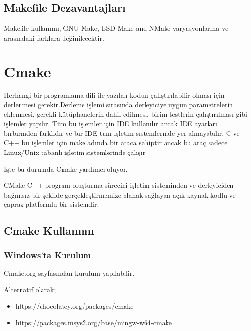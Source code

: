 \documentclass[
]{book}
\providecommand{\tightlist}{%
  \setlength{\itemsep}{0pt}\setlength{\parskip}{0pt}}
\begin{document}
\hypertarget{makefile-dezavantajlarux131}{%
\section{Makefile Dezavantajları}\label{makefile-dezavantajlarux131}}

Makefile kullanımı, GNU Make, BSD Make and NMake varyasyonlarına ve arasındaki farklara değinilecektir.

\hypertarget{cmake}{%
\chapter{Cmake}\label{cmake}}

Herhangi bir programlama dili ile yazılan kodun çalıştırılabilir olması için derlenmesi gerekir.Derleme işlemi sırasında derleyiciye uygun parametrelerin eklenmesi, gerekli kütüphanelerin dahil edilmesi, birim testlerin çalıştırılması gibi işlemler yapılır. Tüm bu işlemler için IDE kullanılır ancak IDE ayarları birbirinden farklıdır ve bir IDE tüm işletim sistemlerinde yer almayabilir.
C ve C++ bu işlemler için make adında bir araca sahiptir ancak bu araç sadece Linux/Unix tabanlı işletim sistemlerinde çalışır.

İşte bu durumda Cmake yardımcı oluyor.

CMake C++ program oluşturma sürecini işletim sisteminden ve derleyiciden bağımsız bir şekilde gerçekleştirmemize olanak sağlayan açık kaynak kodlu ve çapraz platformlu bir sistemdir.

\hypertarget{cmake-kullanux131mux131}{%
\section{Cmake Kullanımı}\label{cmake-kullanux131mux131}}

\hypertarget{windowsta-kurulum}{%
\subsection{Windows'ta Kurulum}\label{windowsta-kurulum}}

Cmake.org sayfasından kurulum yapılabilir.

Alternatif olarak;

\begin{itemize}
\tightlist
\item
  \url{https://chocolatey.org/packages/cmake}
\item
  \url{https://packages.msys2.org/base/mingw-w64-cmake}
\end{itemize}
\end{document}
